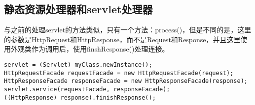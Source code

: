 \subsection{静态资源处理器和servlet处理器}
与之前的处理servlet的方法类似，只有一个方法：process()，但是不同的是，这里的参数是HttpRequest和HttpResponse，而不是Request和Response，并且这里使用外观类作为调用后，使用finshResponse()处理连接。
\begin{lstlisting}
servlet = (Servlet) myClass.newInstance();
HttpRequestFacade requestFacade = new HttpRequestFacade(request);
HttpResponseFacade responseFacade = new HttpResponseFacade(response);
servlet.service(requestFacade, responseFacade);
((HttpResponse) response).finishResponse();
\end{lstlisting}
